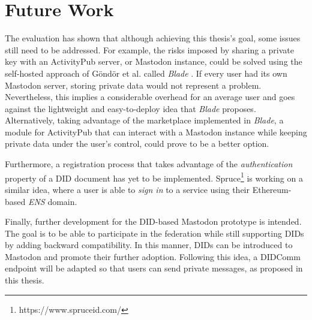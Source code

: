 



\section{Future Work}
The evaluation has shown that although achieving this thesis's goal, some issues still need to be addressed. For example, the risks imposed by sharing a private key with an ActivityPub server, or Mastodon instance, could be solved using the self-hosted approach of Göndör et al. called \emph{Blade} \cite{inproceedings}. If every user had its own Mastodon server, storing private data would not represent a problem. Nevertheless, this implies a considerable overhead for an average user and goes against the lightweight and easy-to-deploy idea that \emph{Blade} proposes. Alternatively, taking advantage of the marketplace implemented in \emph{Blade}, a module for ActivityPub that can interact with a Mastodon instance while keeping private data under the user's control, could prove to be a better option. 

Furthermore, a registration process that takes advantage of the \emph{authentication} property of a DID document has yet to be implemented. Spruce\footnote{https://www.spruceid.com/} is working on a similar idea, where a user is able to \emph{sign in} to a service using their Ethereum-based \emph{ENS} domain. 

Finally, further development for the DID-based Mastodon prototype is intended. The goal is to be able to participate in the federation while still supporting DIDs by adding backward compatibility. In this manner, DIDs can be introduced to Mastodon and promote their further adoption. Following this idea, a DIDComm endpoint will be adapted so that users can send private messages, as proposed in this thesis.
